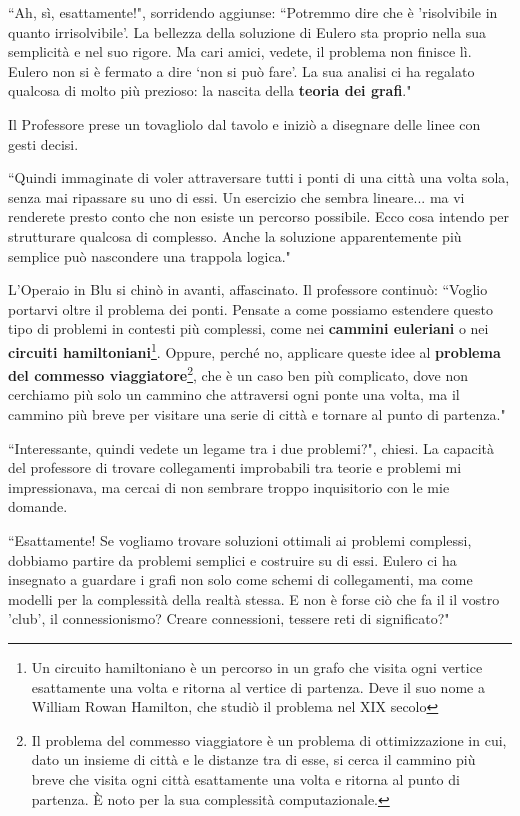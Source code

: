 \documentclass[12pt,b5paper]{article}
\begin{document}
``Ah, sì, esattamente!", sorridendo aggiunse: ``Potremmo  dire che è 'risolvibile
in quanto irrisolvibile'. La bellezza della soluzione di Eulero sta proprio
nella sua semplicità e nel suo rigore. Ma cari amici, vedete, il problema non
finisce lì. Eulero non si è fermato a dire `non si può fare'. La sua analisi ci
ha regalato qualcosa di molto più prezioso: la nascita della \textbf{teoria dei grafi}."

Il Professore prese un tovagliolo dal tavolo e iniziò a disegnare delle linee
con gesti decisi.

``Quindi immaginate di voler attraversare tutti i ponti di una città una volta
sola, senza mai ripassare su uno di essi. Un esercizio che sembra lineare... ma
vi renderete presto conto che non esiste un percorso possibile. Ecco cosa
intendo per strutturare qualcosa di complesso. Anche la soluzione apparentemente
più semplice può nascondere una trappola logica."

L'Operaio in Blu si chinò in avanti, affascinato. Il professore continuò:
``Voglio portarvi oltre il problema dei ponti. Pensate a come possiamo estendere
questo tipo di problemi in contesti più complessi, come nei \textbf{cammini euleriani} o nei \textbf{circuiti hamiltoniani}\footnote{Un circuito hamiltoniano è un percorso in un grafo che visita ogni vertice esattamente una volta e ritorna al vertice di partenza. Deve il suo nome a William Rowan Hamilton, che studiò il problema nel XIX secolo}. Oppure, perché no, applicare queste
idee al \textbf{problema del commesso viaggiatore}\footnote{Il problema del commesso viaggiatore è un problema di ottimizzazione in cui, dato un insieme di città e le distanze tra di esse, si cerca il cammino più breve che visita ogni città esattamente una volta e ritorna al punto di partenza. È noto per la sua complessità computazionale.}, che è un caso ben più complicato,
dove non cerchiamo più solo un cammino che attraversi ogni ponte una volta, ma
il cammino più breve per visitare una serie di città e tornare al punto di
partenza."

``Interessante, quindi vedete un legame tra i due problemi?", chiesi. La
capacità del professore di trovare collegamenti improbabili tra teorie e
problemi mi impressionava, ma cercai di non sembrare troppo inquisitorio con le
mie domande.

``Esattamente! Se vogliamo trovare soluzioni ottimali ai problemi complessi,
dobbiamo partire da problemi semplici e costruire su di essi. Eulero ci ha
insegnato a guardare i grafi non solo come schemi di collegamenti, ma come
modelli per la complessità della realtà stessa. E non è forse ciò che fa il
il vostro 'club', il connessionismo? Creare connessioni, tessere reti di
significato?"
\end{document}
